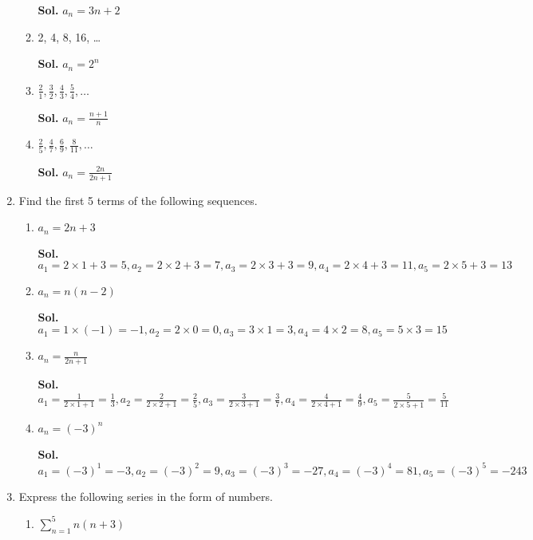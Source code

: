 \documentclass{report}
\begin{document}
\begin{multicols}{2}
\begin{enumerate}
\begin{enumerate}
			\textbf{Sol.} $a_{n} = 3n+2$

		\item 2, 4, 8, 16, \ldots

			\textbf{Sol.} $a_{n} = 2^{n}$

		\item $\frac{2}{1}, \frac{3}{2}, \frac{4}{3}, \frac{5}{4}, \ldots$

			\textbf{Sol.} $a_{n} = \frac{n+1}{n}$

		\item $\frac{2}{5}, \frac{4}{7}, \frac{6}{9}, \frac{8}{11}, \ldots$

			\textbf{Sol.} $a_{n} = \frac{2n}{2n+1}$
	\end{enumerate}

	\item Find the first 5 terms of the following sequences.

	\begin{enumerate}
		\item $a_{n} = 2n+3$

			\textbf{Sol.}
			$a_{1} = 2\times1+3 = 5, a_{2} = 2\times2+3 = 7, a_{3} = 2\times3+3 = 9, a_{4}
			= 2\times4+3 = 11, a_{5} = 2\times5+3 = 13$

		\item $a_{n} = n(n-2)$

			\textbf{Sol.}
			$a_{1} = 1\times(-1) = -1, a_{2} = 2\times0 = 0, a_{3} = 3\times1 = 3, a_{4}
			= 4\times2 = 8, a_{5} = 5\times3 = 15$

		\item $a_{n} = \frac{n}{2n+1}$

			\textbf{Sol.}
			$a_{1} = \frac{1}{2\times1+1}= \frac{1}{3}, a_{2} = \frac{2}{2\times2+1}= \frac{2}{5}
			, a_{3} = \frac{3}{2\times3+1}= \frac{3}{7}, a_{4} = \frac{4}{2\times4+1}=
			\frac{4}{9}, a_{5} = \frac{5}{2\times5+1}= \frac{5}{11}$

		\item $a_{n} = (-3)^{n}$

			\textbf{Sol.}
			$a_{1} = (-3)^{1} = -3, a_{2} = (-3)^{2} = 9, a_{3} = (-3)^{3} = -27, a_{4}
			= (-3)^{4} = 81, a_{5} = (-3)^{5} = -243$
	\end{enumerate}

	\item Express the following series in the form of numbers.

	\begin{enumerate}
		\item $\sum_{n=1}^{5}{n(n+3)}$


\end{enumerate}
\end{enumerate}
\end{multicols}
\end{document}
